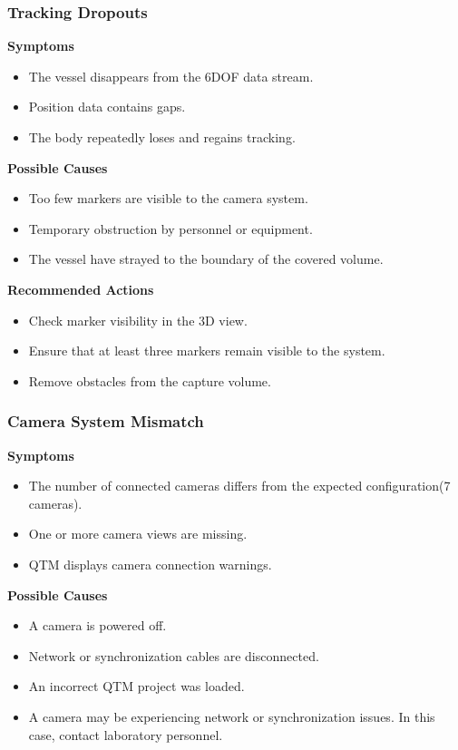 \documentclass[12pt,a4paper]{article}
\begin{document}
	\subsubsection{Tracking Dropouts}
	
	\textbf{Symptoms}
	\begin{itemize}
		\item The vessel disappears from the 6DOF data stream.
		\item Position data contains gaps.
		\item The body repeatedly loses and regains tracking.
	\end{itemize}
	
	\textbf{Possible Causes}
	\begin{itemize}
		\item Too few markers are visible to the camera system.
		\item Temporary obstruction by personnel or equipment.
		\item The vessel have strayed to the boundary of the covered volume. 
	\end{itemize}
	
	\textbf{Recommended Actions}
	\begin{itemize}
		\item Check marker visibility in the 3D view.
		\item Ensure that at least three markers remain visible to the system.
		\item Remove obstacles from the capture volume.
	\end{itemize}
	
	\subsubsection{Camera System Mismatch}
	
	\textbf{Symptoms}
	\begin{itemize}
		\item The number of connected cameras differs from the expected configuration(7 cameras).
		\item One or more camera views are missing.
		\item QTM displays camera connection warnings.
	\end{itemize}
	
	\textbf{Possible Causes}
	\begin{itemize}
		\item A camera is powered off.
		\item Network or synchronization cables are disconnected.
		\item An incorrect QTM project was loaded.
		\item A camera may be experiencing network or synchronization issues. In this case, contact laboratory personnel.
	\end{itemize}
	
\end{document}
